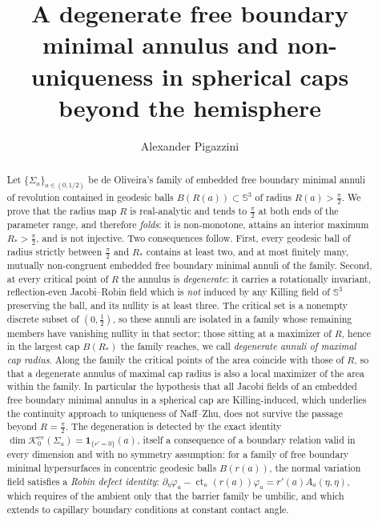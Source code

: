 \documentclass[11pt,a4paper]{amsart}
\title[Degenerate free boundary minimal annuli beyond the hemisphere]
{A degenerate free boundary minimal annulus and non-uniqueness in spherical caps beyond the hemisphere}
\author{Alexander Pigazzini}
\date{}
\theoremstyle{plain}
\theoremstyle{definition}
\newcommand{\Sph}{\mathbb{S}}
\newcommand{\ct}{\operatorname{ct}_\kappa}
\newcommand{\Ker}{\mathcal{K}}
\begin{document}
\begin{abstract}
Let $\{\Sigma_a\}_{a\in(0,1/2)}$ be de Oliveira's family of embedded free boundary minimal annuli of revolution contained in geodesic balls $B(R(a))\subset\Sph^3$ of radius $R(a)>\tfrac\pi2$. We prove that the radius map $R$ is real-analytic and tends to $\tfrac\pi2$ at both ends of the parameter range, and therefore \emph{folds}: it is non-monotone, attains an interior maximum $R_*>\tfrac\pi2$, and is not injective. Two consequences follow. First, every geodesic ball of radius strictly between $\tfrac\pi2$ and $R_*$ contains at least two, and at most finitely many, mutually non-congruent embedded free boundary minimal annuli of the family. Second, at every critical point of $R$ the annulus is \emph{degenerate}: it carries a rotationally invariant, reflection-even Jacobi--Robin field which is \emph{not} induced by any Killing field of $\Sph^3$ preserving the ball, and its nullity is at least three. The critical set is a nonempty discrete subset of $(0,\tfrac12)$, so these annuli are isolated in a family whose remaining members have vanishing nullity in that sector; those sitting at a maximizer of $R$, hence in the largest cap $B(R_*)$ the family reaches, we call \emph{degenerate annuli of maximal cap radius}. Along the family the critical points of the area coincide with those of $R$, so that a degenerate annulus of maximal cap radius is also a local maximizer of the area within the family. In particular the hypothesis that all Jacobi fields of an embedded free boundary minimal annulus in a spherical cap are Killing-induced, which underlies the continuity approach to uniqueness of Naff--Zhu, does not survive the passage beyond $R=\tfrac\pi2$. The degeneration is detected by the exact identity $\dim\Ker_0^{\mathrm{ev}}(\Sigma_a)=\mathbf{1}_{\{r'=0\}}(a)$, itself a consequence of a boundary relation valid in every dimension and with no symmetry assumption: for a family of free boundary minimal hypersurfaces in concentric geodesic balls $B(r(a))$, the normal variation field satisfies a \emph{Robin defect identity}: $\partial_\eta\varphi_a-\ct(r(a))\varphi_a=r'(a)A_a(\eta,\eta)$, which requires of the ambient only that the barrier family be umbilic, and which extends to capillary boundary conditions at constant contact angle.
\end{abstract}

\maketitle
\end{document}
